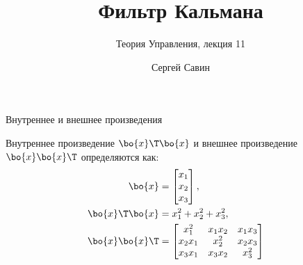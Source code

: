 \documentclass{beamer}
\title{Фильтр Кальмана}
\subtitle{Теория Управления, лекция 11}
\author{Сергей Савин}
\date{\mydate}
\begin{document}
\maketitle






\begin{frame}{Внутреннее и внешнее произведения}
	\begin{flushleft}
		
		Внутреннее произведение $\bo{x}\T \bo{x}$ и внешнее произведение $\bo{x}\bo{x}\T$ определяются как:
		\begin{align*}
			\bo{x} &= 
			\begin{bmatrix}
				x_1 \\ x_2 \\ x_3
			\end{bmatrix},& 
			\\
			\bo{x}\T \bo{x} &= x_1^2+x_2^2+x_3^2, 
			\\
			\bo{x}\bo{x}\T &= 
			\begin{bmatrix}
				x_1^2    & x_1 x_2 & x_1 x_3 \\ 
				x_2 x_1 & x_2^2    & x_2 x_3 \\ 
				x_3 x_1 & x_3 x_2 & x_3^2
			\end{bmatrix}
		\end{align*}	
		
	\end{flushleft}
\end{frame}
\end{document}
